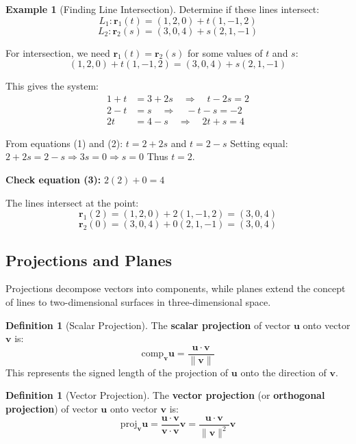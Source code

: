 \documentclass[12pt]{article}
\numberwithin{equation}{section}
\newcommand{\vect}[1]{\boldsymbol{#1}}   %
\theoremstyle{plain}
\theoremstyle{definition}
\newtheorem{definition}[theorem]{Definition}
\newtheorem{example}[theorem]{Example}
\theoremstyle{remark}
\begin{document}
\begin{example}[Finding Line Intersection]
Determine if these lines intersect:
$$L_1: \vect{r}_1(t) = (1, 2, 0) + t(1, -1, 2)$$
$$L_2: \vect{r}_2(s) = (3, 0, 4) + s(2, 1, -1)$$

For intersection, we need $\vect{r}_1(t) = \vect{r}_2(s)$ for some values of $t$ and $s$:
$$(1, 2, 0) + t(1, -1, 2) = (3, 0, 4) + s(2, 1, -1)$$

This gives the system:
\begin{align}
1 + t &= 3 + 2s \quad \Rightarrow \quad t - 2s = 2\\
2 - t &= s \quad \Rightarrow \quad -t - s = -2\\
2t &= 4 - s \quad \Rightarrow \quad 2t + s = 4
\end{align}

From equations (1) and (2): $t = 2 + 2s$ and $t = 2 - s$
Setting equal: $2 + 2s = 2 - s \Rightarrow 3s = 0 \Rightarrow s = 0$
Thus $t = 2$.

\textbf{Check equation (3):} $2(2) + 0 = 4$ \checkmark

The lines intersect at the point:
$$\vect{r}_1(2) = (1, 2, 0) + 2(1, -1, 2) = (3, 0, 4)$$
$$\vect{r}_2(0) = (3, 0, 4) + 0(2, 1, -1) = (3, 0, 4)$$ \checkmark
\end{example}

\subsection{Projections and Planes}

Projections decompose vectors into components, while planes extend the concept of lines to two-dimensional surfaces in three-dimensional space.

\begin{definition}[Scalar Projection]
The \textbf{scalar projection} of vector $\vect{u}$ onto vector $\vect{v}$ is:
$$\text{comp}_{\vect{v}}\vect{u} = \frac{\vect{u} \cdot \vect{v}}{\|\vect{v}\|}$$
This represents the signed length of the projection of $\vect{u}$ onto the direction of $\vect{v}$.
\end{definition}

\begin{definition}[Vector Projection]
The \textbf{vector projection} (or \textbf{orthogonal projection}) of vector $\vect{u}$ onto vector $\vect{v}$ is:
$$\text{proj}_{\vect{v}}\vect{u} = \frac{\vect{u} \cdot \vect{v}}{\vect{v} \cdot \vect{v}}\vect{v} = \frac{\vect{u} \cdot \vect{v}}{\|\vect{v}\|^2}\vect{v}$$
\end{definition}
\end{document}
